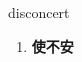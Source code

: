 
\begin{frame}
{\huge disconcert}
\begin{center}
\begin{enumerate}\Large
  \item \textbf{使不安}
\end{enumerate}
\end{center}
\end{frame}
